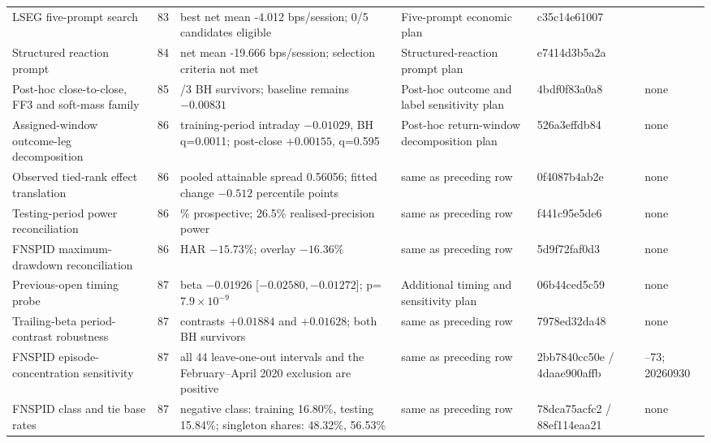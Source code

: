 \begin{longtable}{@{}>{\raggedright\arraybackslash}p{4.8cm} r >{\raggedright\arraybackslash}p{6.2cm} >{\raggedright\arraybackslash}p{5.2cm} l >{\raggedright\arraybackslash}p{2.4cm}@{}}
LSEG five-prompt search & 83 & best net mean -4.012 bps/session; 0/5 candidates eligible & Five-prompt economic plan & c35c14e61007 & 20260813 \\
Structured reaction prompt & 84 & net mean -19.666 bps/session; selection criteria not met & Structured-reaction prompt plan & e7414d3b5a2a & 20260813 \\
Post-hoc close-to-close, FF3 and soft-mass family & 85 & 0/3 BH survivors; baseline remains $-0.00831$ & Post-hoc outcome and label sensitivity plan & 4bdf0f83a0a8 & none \\
Assigned-window outcome-leg decomposition & 86 & training-period intraday $-0.01029$, BH q=0.0011; post-close $+0.00155$, q=0.595 & Post-hoc return-window decomposition plan & 526a3effdb84 & none \\
Observed tied-rank effect translation & 86 & pooled attainable spread 0.56056; fitted change $-0.512$ percentile points & same as preceding row & 0f4087b4ab2e & none \\
Testing-period power reconciliation & 86 & 35.4\% prospective; 26.5\% realised-precision power & same as preceding row & f441c95e5de6 & none \\
FNSPID maximum-drawdown reconciliation & 86 & HAR $-15.73\%$; overlay $-16.36\%$ & same as preceding row & 5d9f72faf0d3 & none \\
Previous-open timing probe & 87 & beta $-0.01926$ [$-0.02580,-0.01272$]; p=$7.9\times10^{-9}$ & Additional timing and sensitivity plan & 06b44ced5c59 & none \\
Trailing-beta period-contrast robustness & 87 & contrasts $+0.01884$ and $+0.01628$; both BH survivors & same as preceding row & 7978ed32da48 & none \\
FNSPID episode-concentration sensitivity & 87 & all 44 leave-one-out intervals and the February--April 2020 exclusion are positive & same as preceding row & 2bb7840cc50e / 4daae900affb & 20260830--73; 20260930 \\
FNSPID class and tie base rates & 87 & negative class: training 16.80\%, testing 15.84\%; singleton shares: 48.32\%, 56.53\% & same as preceding row & 78dca75acfc2 / 88ef114eaa21 & none \\
\bottomrule
\end{longtable}
\endgroup
